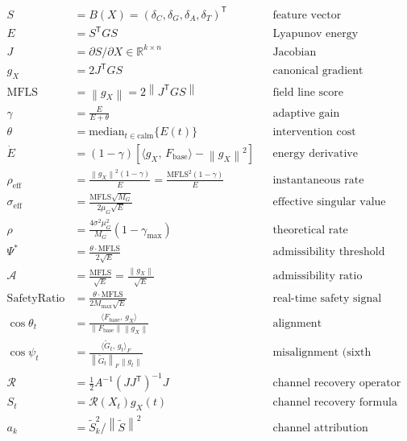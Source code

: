 \documentclass[11pt,a4paper]{article}
\theoremstyle{definition}
\newcommand{\R}{\mathbb{R}}
\newcommand{\T}{^{\mathsf{T}}}
\newcommand{\norm}[1]{\left\|#1\right\|}
\newcommand{\inner}[2]{\langle #1,\,#2\rangle}
\newcommand{\Fbase}{F_{\mathrm{base}}}
\newcommand{\gX}{g_X}
\newcommand{\mfls}{\mathrm{MFLS}}
\begin{document}
\begin{resultbox}
\begin{align*}
S &= B(X) = (\delta_C,\delta_G,\delta_A,\delta_T)\T &&\text{feature vector} \\[4pt]
E &= S\T GS &&\text{Lyapunov energy} \\[4pt]
J &= \partial S/\partial X \in \R^{k\times n} &&\text{Jacobian} \\[4pt]
\gX &= 2J\T GS &&\text{canonical gradient} \\[4pt]
\mfls &= \norm{\gX} = 2\norm{J\T GS} &&\text{field line score} \\[4pt]
\gamma &= \frac{E}{E+\theta} &&\text{adaptive gain} \\[4pt]
\theta &= \mathrm{median}_{t\in\text{calm}}\{E(t)\} &&\text{intervention cost} \\[4pt]
\dot E &= (1-\gamma)\left[\inner{\gX}{\Fbase}-\norm{\gX}^2\right] &&\text{energy derivative} \\[4pt]
\rho_\mathrm{eff} &= \frac{\norm{\gX}^2(1-\gamma)}{E} = \frac{\mfls^2(1-\gamma)}{E} &&\text{instantaneous rate} \\[4pt]
\sigma_\mathrm{eff} &= \frac{\mfls\sqrt{M_G}}{2\mu_G\sqrt{E}} &&\text{effective singular value} \\[4pt]
\rho &= \frac{4\sigma^2\mu_G^2}{M_G}(1-\gamma_\mathrm{max}) &&\text{theoretical rate} \\[4pt]
\Psi^* &= \frac{\theta\cdot\mfls}{2\sqrt{E}} &&\text{admissibility threshold} \\[4pt]
\mathcal{A} &= \frac{\mfls}{\sqrt{E}} = \frac{\norm{\gX}}{\sqrt{E}} &&\text{admissibility ratio} \\[4pt]
\text{SafetyRatio} &= \frac{\theta\cdot\mfls}{2M_\mathrm{max}\sqrt{E}} &&\text{real-time safety signal} \\[4pt]
\cos\theta_t &= \frac{\inner{\Fbase}{\gX}}{\norm{\Fbase}\norm{\gX}} &&\text{alignment} \\[4pt]
\cos\psi_t &= \frac{\inner{\tilde G_t}{g_t}_F}{\norm{\tilde G_t}_F\norm{g_t}} &&\text{misalignment (sixth signal)} \\[4pt]
\mathcal{R} &= \frac{1}{2}A^{-1}(JJ\T)^{-1}J &&\text{channel recovery operator} \\[4pt]
S_t &= \mathcal{R}(X_t)\gX(t) &&\text{channel recovery formula} \\[4pt]
a_k &= \tilde S_k^2/\norm{\tilde S}^2 &&\text{channel attribution}
\end{align*}
\end{resultbox}
\end{document}
